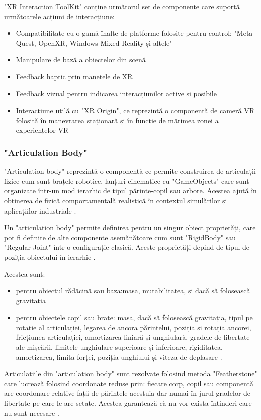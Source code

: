 "XR Interaction ToolKit" conține următorul set de componente care suportă următoarele acțiuni de interacțiune:
\begin{itemize}
	\item Compatibilitate cu o gamă înalte de platforme folosite pentru control: "Meta Quest, OpenXR, Windows Mixed Reality și altele" \cite{XRI}
	\item Manipulare de bază a obiectelor din scenă \cite{XRI}
	\item Feedback haptic prin manetele de XR \cite{XRI}
	\item Feedback vizual pentru indicarea interacțiunilor active și posibile \cite{XRI}
	\item Interacțiune utilă cu "XR Origin", ce reprezintă o componentă de cameră VR folosită în manevrarea staționară și în funcție de mărimea zonei a experiențelor VR \cite{XRI}
\end{itemize}

\subsubsection{"Articulation Body"}
"Articulation body" reprezintă o componentă ce permite construirea de articulații fizice cum sunt brațele robotice, lanțuri cinematice cu "GameObjects" care sunt organizate într-un mod ierarhic de tipul părinte-copil sau arbore. Acestea ajută în obținerea de fizică comportamentală realistică în contextul simulărilor și aplicațiilor industriale \cite{ABC}.



Un "articulation body" permite definirea pentru un singur obiect proprietăți, care pot fi definite de alte componente asemănătoare cum sunt "RigidBody" sau "Regular Joint" într-o configurație clasică. Aceste proprietăți depind de tipul de poziția obiectului în ierarhie \cite{ABC}. 

Acestea sunt:
\begin{itemize}
	\item pentru obiectul rădăcină sau baza:masa, mutabilitatea, și dacă să folosească gravitația \cite{ABC}
	\item pentru obiectele copil sau brațe: masa, dacă să folosească gravitația, tipul pe rotație al articulației, legarea de ancora părintelui, poziția și rotația ancorei, fricțiunea articulației, amortizarea liniară și unghiulară, gradele de libertate ale mișcării, limitele unghiulare superioare și inferioare, rigiditatea, amortizarea, limita forței, poziția unghiului și viteza de deplasare \cite{ABC}.
\end{itemize}
Articulațiile din "articulation body" sunt rezolvate folosind metoda "Featherstone" care lucrează folosind coordonate reduse prin: fiecare corp, copil sau componentă are coordonare relative față de  părintele acestuia dar numai în jurul gradelor de libertate pe care le are setate. Acestea garantează că nu vor exista întinderi care nu sunt necesare \cite{ABC1}.


